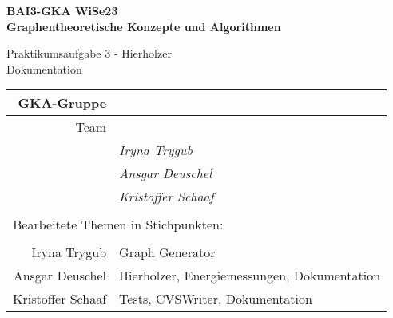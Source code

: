 

\thispagestyle{empty}
\begin{center}

    {\large {\bf   BAI3-GKA WiSe23 \\ Graphentheoretische Konzepte und Algorithmen \\[5mm]} }
    
{\huge Praktikumsaufgabe 3 - Hierholzer \\[5mm] Dokumentation}\\

\end{center}

				\begin{tabular}[t]{|r|l|}
				 \hline
				GKA-Gruppe&                 \raisebox{-3mm}{\rule[8mm]{100mm}{0mm} }\\ \hline    
				Team &                                                        \\ \hline			
				& \textit{Iryna Trygub }               \\ \hline    
				& \textit{Ansgar Deuschel }               \\ \hline			
				& \textit{Kristoffer Schaaf }             \\ \hline  			
				\multicolumn{2}{c}{}\\  			
				\multicolumn{2}{l}{Bearbeitete Themen in Stichpunkten:}\\			
				\multicolumn{2}{c}{}\\  \hline
				Iryna Trygub & Graph Generator            \\ \hline    
				Ansgar Deuschel & Hierholzer, Energiemessungen, Dokumentation                \\ \hline
				Kristoffer Schaaf & Tests, CVSWriter, Dokumentation            \\ \hline 		
							
						
				\end{tabular}
~\\[4mm]
		
		
\vfill

